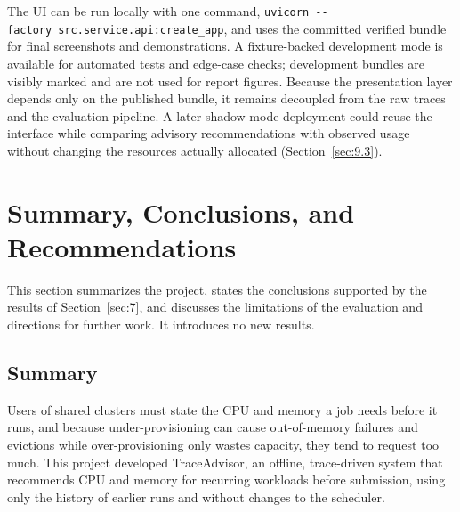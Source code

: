 \documentclass{IEEEtran}
\begin{document}
The UI can be run locally with one command, \texttt{uvicorn\ -\/-factory\ src.service.api:create\_app}, and uses the committed verified bundle for final screenshots and demonstrations. A fixture-backed development mode is available for automated tests and edge-case checks; development bundles are visibly marked and are not used for report figures. Because the presentation layer depends only on the published bundle, it remains decoupled from the raw traces and the evaluation pipeline. A later shadow-mode deployment could reuse the interface while comparing advisory recommendations with observed usage without changing the resources actually allocated (Section~\ref{sec:9.3}).

\section{Summary, Conclusions, and Recommendations}\label{sec:9}

This section summarizes the project, states the conclusions supported by the results of Section~\ref{sec:7}, and discusses the limitations of the evaluation and directions for further work. It introduces no new results.

\subsection{Summary}\label{sec:9.1}

Users of shared clusters must state the CPU and memory a job needs before it runs, and because under-provisioning can cause out-of-memory failures and evictions while over-provisioning only wastes capacity, they tend to request too much. This project developed TraceAdvisor, an offline, trace-driven system that recommends CPU and memory for recurring workloads before submission, using only the history of earlier runs and without changes to the scheduler.
\end{document}
